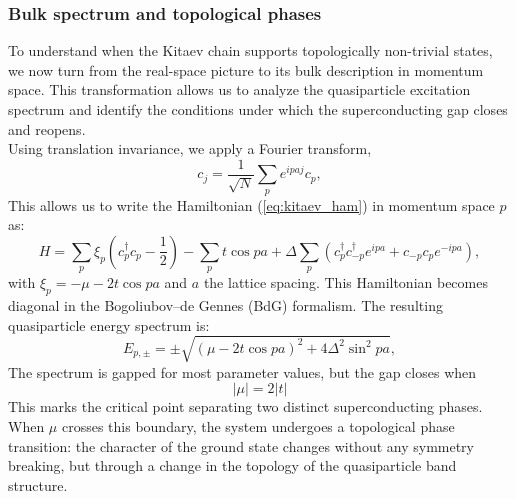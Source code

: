 \documentclass[11pt, letterpaper, titlepage]{article}
\begin{document}
\subsubsection{Bulk spectrum and topological phases}
To understand when the Kitaev chain supports topologically non-trivial states, we now turn from the real-space picture to its bulk description in momentum space. This transformation allows us to analyze the quasiparticle excitation spectrum and identify the conditions under which the superconducting gap closes and reopens.\\
Using translation invariance, we apply a Fourier transform,
$$
c_j = \frac{1}{\sqrt{N}} \sum_p e^{ipaj} c_p,
$$
This allows us to write the Hamiltonian (\ref{eq:kitaev_ham}) in momentum space $p$ as:
\begin{equation}
H = ∑_{ p}^{} ξ_p\left(c_p^{†} c_p - \frac{1}{2}\right) - ∑_{p}^{} t \cos p a + Δ ∑_{p}^{}\left(c_p^{†} c_{-p}^{†} e^{ipa} + c_{-p} c_p e^{-ipa}\right), 
\end{equation}
with $ξ_p = -μ - 2t \cos pa$ and $a$ the lattice spacing. This Hamiltonian becomes diagonal in the Bogoliubov–de Gennes (BdG) formalism. The resulting quasiparticle energy spectrum is:
\begin{equation}
  E_{p,\pm} = \pm \sqrt{(μ - 2t \cos{pa})^2 + 4Δ^2 \sin^2{pa}},
\end{equation}
The spectrum is gapped for most parameter values, but the gap closes when
$$
|μ| = 2|t|
$$
This marks the critical point separating two distinct superconducting phases. When $μ$ crosses this boundary, the system undergoes a topological phase transition: the character of the ground state changes without any symmetry breaking, but through a change in the topology of the quasiparticle band structure.\\
\end{document}
